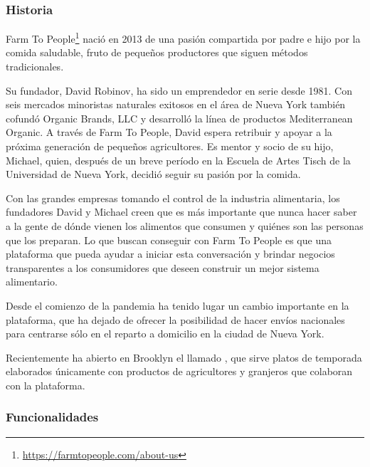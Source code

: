
\subsubsection{Historia}

Farm To People\footnote{\url{https://farmtopeople.com/about-us}} nació en 2013 de una pasión compartida por padre e hijo por la comida saludable, fruto de pequeños productores que siguen métodos tradicionales.

Su fundador, David Robinov, ha sido un emprendedor en serie desde 1981. Con seis mercados minoristas naturales exitosos en el área de Nueva York también cofundó Organic Brands, LLC y desarrolló la línea de productos Mediterranean Organic. A través de Farm To People, David espera retribuir y apoyar a la próxima generación de pequeños agricultores. Es mentor y socio de su hijo, Michael, quien, después de un breve período en la Escuela de Artes Tisch de la Universidad de Nueva York, decidió seguir su pasión por la comida.

Con las grandes empresas tomando el control de la industria alimentaria, los fundadores David y Michael creen que es más importante que nunca hacer saber a la gente de dónde vienen los alimentos que consumen y quiénes son las personas que los preparan. Lo que buscan conseguir con Farm To People es que una plataforma que pueda ayudar a iniciar esta conversación y brindar negocios transparentes a los consumidores que deseen construir un mejor sistema alimentario.

Desde el comienzo de la pandemia ha tenido lugar un cambio importante en la plataforma, que ha dejado de ofrecer la posibilidad de hacer envíos nacionales para centrarse sólo en el reparto a domicilio en la ciudad de Nueva York.

Recientemente ha abierto en Brooklyn el llamado , que sirve platos de temporada elaborados únicamente con productos de agricultores y granjeros que colaboran con la plataforma.

\subsubsection{Funcionalidades}

